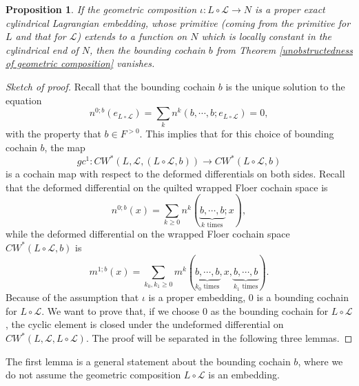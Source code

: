 \documentclass{amsart}
\newtheorem{proposition}[theorem]{Proposition}
\numberwithin{equation}{section}
\numberwithin{figure}{section}
\begin{document}
\begin{proposition}\label{vanishing of the bounding cochain}
	If the geometric composition $\iota: L \circ \mathcal{L} \to N$ is a proper exact cylindrical Lagrangian embedding, whose primitive (coming from the primitive for $L$ and that for $\mathcal{L}$) extends to a function on $N$ which is locally constant in the cylindrical end of $N$, then the bounding cochain $b$ from Theorem \ref{unobstructedness of geometric composition} vanishes.
\end{proposition}
\begin{proof}[Sketch of proof]
	Recall that the bounding cochain $b$ is the unique solution to the equation
\begin{equation}
n^{0; b}(e_{L \circ \mathcal{L}}) = \sum_{k} n^{k}(b, \cdots, b; e_{L \circ \mathcal{L}}) = 0,
\end{equation}
with the property that $b \in F^{>0}$.
This implies that for this choice of bounding cochain $b$, the map
\begin{equation}
gc^{1}: CW^{*}(L, \mathcal{L}, (L \circ \mathcal{L}, b)) \to CW^{*}(L \circ \mathcal{L}, b)
\end{equation}
is a cochain map with respect to the deformed differentials on both sides. 
Recall that the deformed differential on the quilted wrapped Floer cochain space is
\begin{equation*}
n^{0; b}(x) = \sum_{k \ge 0} n^{k}(\underbrace{b, \cdots, b}_{k \text{ times}}; x),
\end{equation*}
while the deformed differential on the wrapped Floer cochain space $CW^{*}(L \circ \mathcal{L}, b)$ is
\begin{equation*}
m^{1; b}(x) = \sum_{k_{0}, k_{1} \ge 0} m^{k}(\underbrace{b, \cdots, b}_{k_{0} \text{ times}}, x, \underbrace{b, \cdots, b}_{k_{1} \text{ times}}).
\end{equation*}
Because of the assumption that $\iota$ is a proper embedding, $0$ is a bounding cochain for $L \circ \mathcal{L}$.
We want to prove that, if we choose $0$ as the bounding cochain for $L \circ \mathcal{L}$, the cyclic element is closed under the undeformed differential on $CW^{*}(L, \mathcal{L}, L \circ \mathcal{L})$. The proof will be separated in the following three lemmas. \par

\end{proof}

	The first lemma is a general statement about the bounding cochain $b$, where we do not assume the geometric composition $L \circ \mathcal{L}$ is an embedding. \par
\end{document}
